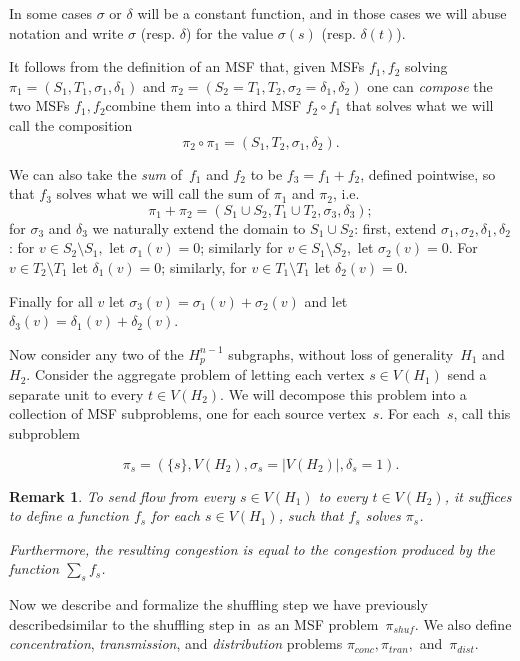 \documentclass[
final
]{dmtcs-episciences}
\newtheorem{remark}[theorem]{Remark}
\begin{document}
In some cases $\sigma$ or $\delta$ will be a constant function, and in those cases we will abuse notation and write $\sigma$ (resp. $\delta$) for the value $\sigma(s)$ (resp. $\delta(t)$).

It follows from the definition of an MSF that, given MSFs $f_1, f_2$ solving $\pi_1 = (S_1, T_1, \sigma_1, \delta_1)$ and $\pi_2 = (S_2 = T_1, T_2, \sigma_2 = \delta_1, \delta_2)$  one can \emph{compose} the two MSFs $f_1, f_2$\textemdash combine them into a third MSF $f_2 \circ f_1$ that solves what we will call the composition 
\[
\pi_2 \circ \pi_1 = (S_1, T_2, \sigma_1, \delta_2).\]

We can also take the \emph{sum} of~$f_1$ and $f_2$ to be $f_3 = f_1 + f_2$, defined pointwise, so that $f_3$ solves what we will call the sum of $\pi_1$ and $\pi_2$, i.e.
\[\pi_1 + \pi_2 = (S_1 \cup S_2, T_1 \cup T_2, \sigma_3, \delta_3);
\]
for $\sigma_3$ and $\delta_3$ we naturally extend the domain to $S_1 \cup S_2$:
first, extend $\sigma_1, \sigma_2, \delta_1, \delta_2$: for $v \in S_2 \setminus S_1,$ let $\sigma_1(v) = 0$; similarly for $v \in S_1 \setminus S_2,$ let $\sigma_2(v) = 0$. For $v \in T_2 \setminus T_1$ let $\delta_1(v) = 0$; similarly, for $v \in T_1 \setminus T_1$ let $\delta_2(v) = 0$.

Finally for all $v$ let $\sigma_3(v) = \sigma_1(v) + \sigma_2(v)$ and let $\delta_3(v) = \delta_1(v) + \delta_2(v)$.

Now consider any two of the $H_p^{n-1}$ subgraphs, without loss of generality~$H_1$ and~$H_2$. Consider the aggregate problem of letting each vertex $s \in V(H_1)$ send a separate unit to every $t \in V(H_2)$. We will decompose this problem into a collection of MSF subproblems, one for each source vertex~$s$. For each~$s$, call this subproblem

\[
    \pi_s = (\{s\}, V(H_2), \sigma_s = |V(H_2)|, \delta_s = 1).
\]

\begin{remark}
    To send flow from every $s \in V(H_1)$ to every $t \in V(H_2)$, it suffices to define a function $f_s$ for each $s \in V(H_1)$, such that $f_s$ solves $\pi_s$.

    Furthermore, the resulting congestion is equal to the congestion produced by the function $\sum_s f_s$.
\end{remark}

Now we describe and formalize the shuffling step we have previously described\textemdash similar to the shuffling step in~\cite{eppfrishtri}\textemdash as an MSF problem~$\pi_{shuf}$. We also define \emph{concentration}, \emph{transmission}, and \emph{distribution} problems $\pi_{conc}, \pi_{tran},$ and~$\pi_{dist}$.
\end{document}
